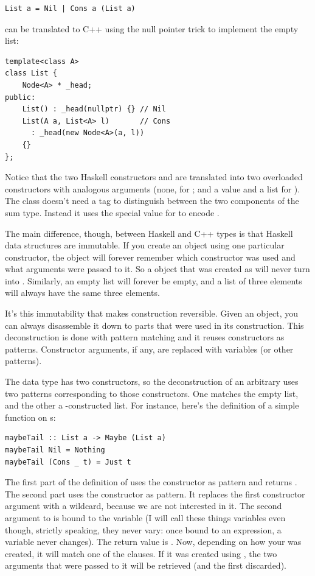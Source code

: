 \begin{verbatim}
List a = Nil | Cons a (List a)
\end{verbatim}

\noindent
can be translated to C++ using the null pointer trick to implement the
empty list:

\begin{verbatim}
template<class A>
class List { 
    Node<A> * _head;
public:
    List() : _head(nullptr) {} // Nil
    List(A a, List<A> l)       // Cons
      : _head(new Node<A>(a, l))
    {}
};
\end{verbatim}

\noindent
Notice that the two Haskell constructors  and 
are translated into two overloaded  constructors with
analogous arguments (none, for ; and a value and a list for
). The  class doesn't need a tag to
distinguish between the two components of the sum type. Instead it uses
the special  value for  to encode
.

The main difference, though, between Haskell and C++ types is that
Haskell data structures are immutable. If you create an object using one
particular constructor, the object will forever remember which
constructor was used and what arguments were passed to it. So a
 object that was created as  will
never turn into . Similarly, an empty list will forever
be empty, and a list of three elements will always have the same three
elements.

It's this immutability that makes construction reversible. Given an
object, you can always disassemble it down to parts that were used in
its construction. This deconstruction is done with pattern matching and
it reuses constructors as patterns. Constructor arguments, if any, are
replaced with variables (or other patterns).

The  data type has two constructors, so the deconstruction
of an arbitrary  uses two patterns corresponding to those
constructors. One matches the empty  list, and the other a
-constructed list. For instance, here's the definition of a
simple function on s:

\begin{verbatim}
maybeTail :: List a -> Maybe (List a)
maybeTail Nil = Nothing
maybeTail (Cons _ t) = Just t
\end{verbatim}

\noindent
The first part of the definition of  uses the
 constructor as pattern and returns . The
second part uses the  constructor as pattern. It replaces
the first constructor argument with a wildcard, because we are not
interested in it. The second argument to  is bound to the
variable  (I will call these things variables even though,
strictly speaking, they never vary: once bound to an expression, a
variable never changes). The return value is . Now,
depending on how your  was created, it will match one of
the clauses. If it was created using , the two arguments
that were passed to it will be retrieved (and the first discarded).

